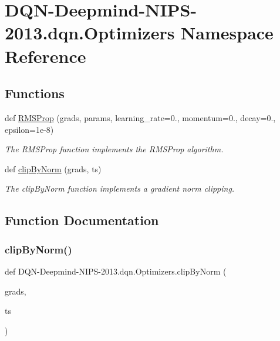 \hypertarget{namespaceDQN-Deepmind-NIPS-2013_1_1dqn_1_1Optimizers}{}\section{D\+Q\+N-\/\+Deepmind-\/\+N\+I\+P\+S-\/2013.dqn.\+Optimizers Namespace Reference}
\label{namespaceDQN-Deepmind-NIPS-2013_1_1dqn_1_1Optimizers}
\subsection*{Functions}
\begin{DoxyCompactItemize}
\item 
def \hyperlink{namespaceDQN-Deepmind-NIPS-2013_1_1dqn_1_1Optimizers_a83bf1e32b34c7f7e9c7a8755969513ed}{R\+M\+S\+Prop} (grads, params, learning\+\_\+rate=0., momentum=0., decay=0., epsilon=1e-\/8)
\begin{DoxyCompactList}\small\item\em The R\+M\+S\+Prop function implements the R\+M\+S\+Prop algorithm. \end{DoxyCompactList}\item 
def \hyperlink{namespaceDQN-Deepmind-NIPS-2013_1_1dqn_1_1Optimizers_a1c829fc193cf21632ab890a2bf5a3353}{clip\+By\+Norm} (grads, ts)
\begin{DoxyCompactList}\small\item\em The clip\+By\+Norm function implements a gradient norm clipping. \end{DoxyCompactList}\end{DoxyCompactItemize}


\subsection{Function Documentation}
\hypertarget{namespaceDQN-Deepmind-NIPS-2013_1_1dqn_1_1Optimizers_a1c829fc193cf21632ab890a2bf5a3353}{}\label{namespaceDQN-Deepmind-NIPS-2013_1_1dqn_1_1Optimizers_a1c829fc193cf21632ab890a2bf5a3353} 
\subsubsection{\texorpdfstring{clip\+By\+Norm()}{clipByNorm()}}
{\footnotesize\ttfamily def D\+QN-\/Deepmind-\/N\+I\+PS-\/2013.dqn.\+Optimizers.\+clip\+By\+Norm (\begin{DoxyParamCaption}\item[{}]{grads,  }\item[{}]{ts }\end{DoxyParamCaption})}



